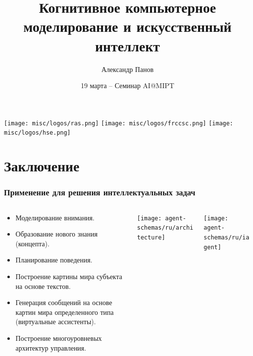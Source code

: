 \documentclass[default]{beamer}
\begin{document}
	
	\title[Психология и ИИ]{Когнитивное компьютерное моделирование и искусственный интеллект}
	\author[Панов]{Александр Панов}
	\date{19 марта -- Семинар AI@MIPT} 
	
	\begin{frame}
		\titlepage
		\centering
		\texttt{[image: misc/logos/ras.png]} \hspace{10pt}
		\texttt{[image: misc/logos/frccsc.png]} \hspace{10pt}
		\texttt{[image: misc/logos/hse.png]}
	\end{frame}
	
	\begin{frame}
		\small
		\tableofcontents
	\end{frame}

	

	
	
	
	
	

	\section{Заключение}
		\begin{frame}
		\frametitle{Применение для решения интеллектуальных задач}
		\vspace{-5pt}
		\footnotesize
		\begin{columns}
			\begin{column}{0.5\textwidth}
				\begin{itemize}
					\item Моделирование внимания.
					\item Образование нового знания (концепта).
					\item Планирование поведения.
					\item Построение картины мира субъекта на основе текстов.
					\item Генерация сообщений на основе картин мира определенного типа (виртуальные ассистенты).
					\item Построение многоуровневых архитектур управления.
				\end{itemize}
				
			\end{column}
			\begin{column}{0.35\textwidth}
				\texttt{[image: agent-schemas/ru/architecture]}
			\end{column}
			\begin{column}{0.15\textwidth}
				\texttt{[image: agent-schemas/ru/iagent]}
			\end{column}
			
		\end{columns}
		\vspace{-5pt}
		\nocite{*}
		\printbibliography[keyword={strl}, resetnumbers=true]
	\end{frame}
\end{document}
